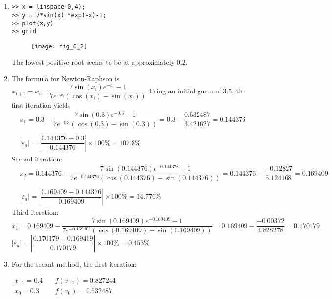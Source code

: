 \documentclass[../main.tex]{subfiles}
\begin{document}
\section{}
\begin{enumerate}[label=\bfseries(\alph*)]
\item
\begin{lstlisting}[numbers=none]
>> x = linspace(0,4);
>> y = 7*sin(x).*exp(-x)-1;
>> plot(x,y)
>> grid 
\end{lstlisting}
\bigbreak
\begin{figure}[H]
		\hspace*{1cm}\texttt{[image: fig\_6\_2]}
		\label{fig:fig_6_2}
	\end{figure}
	\bigbreak
\bigbreak
The lowest positive root seems to be at approximately $0.2$.
\bigbreak
\item The formula for Newton-Raphson is
\bigbreak
$x_{i+1}=x_{i}-\dfrac{7 \sin \left(x_{i}\right) e^{-x_{i}}-1}{7 e^{-x_{i}}\left(\cos \left(x_{i}\right)-\sin \left(x_{i}\right)\right)}$
\bigbreak
Using an initial guess of $3.5$, the first iteration yields
\bigbreak$
\begin{aligned}
&x_{1}=0.3-\dfrac{7 \sin (0.3) e^{-0.3}-1}{7 e^{-0.3}(\cos (0.3)-\sin (0.3))}=0.3-\dfrac{0.532487}{3.421627}=0.144376 \\\\
&\left|\varepsilon_{a}\right|=\left|\dfrac{0.144376-0.3}{0.144376}\right| \times 100 \%=107.8 \%
\end{aligned}$
\bigbreak
Second iteration:
\bigbreak$
\begin{aligned}
&x_{2}=0.144376-\dfrac{7 \sin (0.144376) e^{-0.144376}-1}{7 e^{-0.144376}(\cos (0.144376)-\sin (0.144376))}=0.144376-\dfrac{-0.12827}{5.124168}=0.169409 \\\\
&\left|\varepsilon_{a}\right|=\left|\dfrac{0.169409-0.144376}{0.169409}\right| \times 100 \%=14.776 \%
\end{aligned}$
\bigbreak
Third iteration:
\bigbreak
$x_{1}=0.169409-\dfrac{7 \sin (0.169409) e^{-0.169409}-1}{7 e^{-0.169409}(\cos (0.169409)-\sin (0.169409))}=0.169409-\dfrac{-0.00372}{4.828278}=0.170179$
\bigbreak
$\left|\varepsilon_{a}\right|=\left|\dfrac{0.170179-0.169409}{0.170179}\right| \times 100 \%=0.453 \%$
\bigbreak

\item For the secant method, the first iteration:
\bigbreak

$\begin{array}{ll}x_{-1}=0.4 &\quad f\left(x_{-1}\right)=0.827244 \\x_{0}=0.3 &\quad f\left(x_{0}\right)=0.532487\end{array}$


\end{enumerate}
\end{document}
